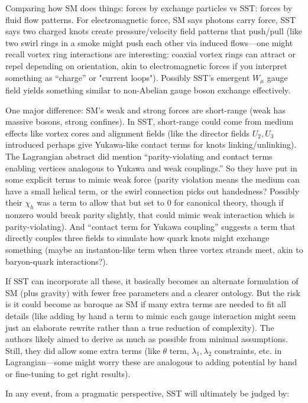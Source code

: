 \documentclass[10pt,reprint,aps,onecolumn,nofootinbib]{revtex4-2}
\begin{document}
Comparing how SM does things: forces by exchange particles vs SST: forces by fluid flow patterns. For electromagnetic force, SM says photons carry force, SST says two charged knots create pressure/velocity field patterns that push/pull (like two swirl rings in a smoke might push each other via induced flows—one might recall vortex ring interactions are interesting: coaxial vortex rings can attract or repel depending on orientation, akin to electromagnetic forces if you interpret something as “charge” or "current loops"). Possibly SST’s emergent $W_\mu$ gauge field yields something similar to non-Abelian gauge boson exchange effectively.


One major difference: SM’s weak and strong forces are short-range (weak has massive bosons, strong confines). In SST, short-range could come from medium effects like vortex cores and alignment fields (like the director fields $U_2, U_3$ introduced perhaps give Yukawa-like contact terms for knots linking/unlinking). The Lagrangian abstract did mention “parity-violating and contact terms enabling vertices analogous to Yukawa and weak couplings.” So they have put in some explicit terms to mimic weak force (parity violation means the medium can have a small helical term, or the swirl connection picks out handedness? Possibly their $\chi_h$ was a term to allow that but set to 0 for canonical theory, though if nonzero would break parity slightly, that could mimic weak interaction which is parity-violating). And “contact term for Yukawa coupling” suggests a term that directly couples three fields to simulate how quark knots might exchange something (maybe an instanton-like term when three vortex strands meet, akin to baryon-quark interactions?).


If SST can incorporate all these, it basically becomes an alternate formulation of SM (plus gravity) with fewer free parameters and a clearer ontology. But the risk is it could become as baroque as SM if many extra terms are needed to fit all details (like adding by hand a term to mimic each gauge interaction might seem just an elaborate rewrite rather than a true reduction of complexity). The authors likely aimed to derive as much as possible from minimal assumptions. Still, they did allow some extra terms (like $\theta$ term, $\lambda_1, \lambda_2$ constraints, etc. in Lagrangian—some might worry these are analogous to adding potential by hand or fine-tuning to get right results).


In any event, from a pragmatic perspective, SST will ultimately be judged by:
\end{document}
